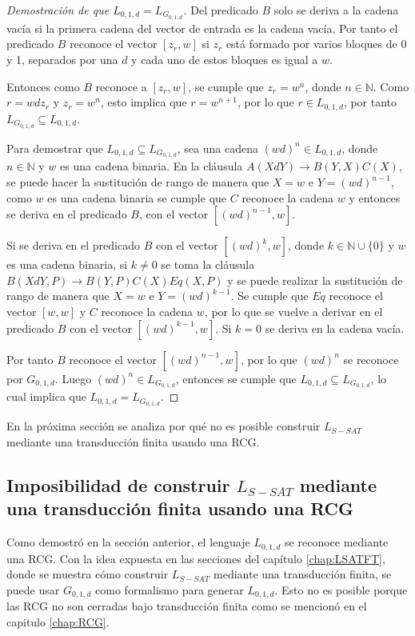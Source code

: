 \begin{proof}[Demostración de que $L_{0,1,d}=L_{G_{0,1,d}}$]
    Del predicado $B$ solo se deriva a la cadena vacía si la primera cadena del vector
    de entrada es la cadena vacía. Por tanto el predicado $B$ reconoce el vector $[z_r,w]$ si $z_r$ está formado 
    por varios bloques de 0 y 1, separados por una $d$ y cada uno de estos bloques es igual a $w$.
    
    Entonces como $B$ reconoce a $[z_r,w]$, se cumple que $z_r=w^n$, donde $n\in \mathbb{N}$. Como
    $r=wdz_r$ y $z_r=w^n$, esto implica que $r=w^{n+1}$, por lo que $r\in L_{0,1,d}$, por tanto 
    $L_{G_{0,1,d}}\subseteq L_{0,1,d}$.
    
    Para demostrar que $L_{0,1,d}\subseteq L_{G_{0,1,d}}$, sea una cadena $(wd)^n\in L_{0,1,d}$, donde 
    $n\in \mathbb{N}$ y $w$ es una cadena binaria. En la cláusula $A(XdY)\to B(Y,X)C(X)$, se puede hacer 
    la sustitución de rango de manera que  $X=w$ e $Y=(wd)^{n-1}$, como $w$ es una cadena binaria se cumple 
    que $C$ reconoce la cadena $w$ y entonces se deriva en el predicado $B$, con el vector $[(wd)^{n-1},w]$.
    
    Si se deriva en el predicado $B$ con el vector $[(wd)^k,w]$, donde 
    $k\in \mathbb{N} \cup \{0\}$ y $w$ es una cadena binaria, si $k\neq 0$ se toma la cláusula
    $B(XdY,P)\to B(Y,P) C(X) Eq(X,P)$ y se puede realizar la sustitución de rango de manera que
    $X=w$ e $Y=(wd)^{k-1}$. Se cumple que $Eq$ reconoce el vector $[w,w]$ y $C$ reconoce la cadena $w$,
    por lo que se vuelve a derivar en el  predicado $B$ con el vector $[(wd)^{k-1},w]$. Si $k=0$ se deriva
    en la cadena vacía.
    
    Por tanto $B$ reconoce el vector $[(wd)^{n-1},w]$, por lo que $(wd)^n$ se reconoce por $G_{0,1,d}$. Luego
    $(wd)^n\in L_{G_{0,1,d}}$, entonces se cumple que $L_{0,1,d}\subseteq L_{G_{0,1,d}}$, lo cual implica
    que $L_{0,1,d} = L_{G_{0,1,d}}$.
\end{proof}

En la próxima sección se analiza por qué no es posible construir $L_{S-SAT}$ mediante una transducción finita usando
una RCG.

\subsection{Imposibilidad de construir $L_{S-SAT}$ mediante una transducción finita usando una RCG}

Como demostró en la sección anterior, el lenguaje $L_{0,1,d}$ se reconoce mediante una RCG. 
Con la idea expuesta en las secciones del capítulo \ref{chap:LSATFT}, donde se muestra cómo construir 
$L_{S-SAT}$ mediante una transducción finita, se puede usar $G_{0,1,d}$ como formalismo para generar 
$L_{0,1,d}$.  Esto no es posible porque las RCG no son cerradas bajo transducción finita como se mencionó 
en el capitulo \ref{chap:RCG}. 

